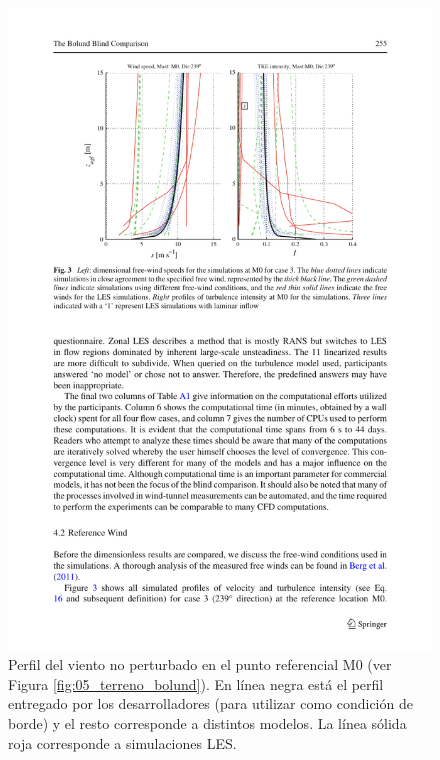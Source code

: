 \begin{figure}[H]
	\centering
	\includegraphics[width=0.85\linewidth,trim={2.7cm 14.3cm 2.0cm 2cm},clip]{bolund1.pdf}%
	\caption{Perfil del viento no perturbado en el punto referencial M0 (ver Figura \ref{fig:05_terreno_bolund}). En línea negra está el perfil entregado por los desarrolladores (para utilizar como condición de borde) y el resto corresponde a distintos modelos. La línea sólida roja corresponde a simulaciones LES.}
	\label{fig:an1_m0}
\end{figure}


